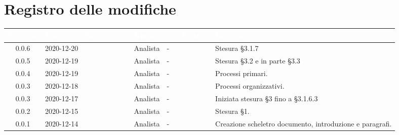 \section*{Registro delle modifiche}
{
\renewcommand{\arraystretch}{1.5}
\centering
\begin{longtable}{c C{2.6cm} C{2.6cm} C{2.6cm} C{2.6cm} C{3.5cm}}
\textcolor{white}{\textbf{Versione}}&
\textcolor{white}{\textbf{Data}}&
\textcolor{white}{\textbf{Nominativo}}&
\textcolor{white}{\textbf{Ruolo}}&
\textcolor{white}{\textbf{Verificatore}}&
\textcolor{white}{\textbf{Descrizione}}\\	
\endhead

0.0.6 & 2020-12-20 & \PA{} & Analista & - & Stesura \S 3.1.7 \\
0.0.5 & 2020-12-19 & \RA{} & Analista & - & Stesura \S 3.2 e in parte \S 3.3 \\
0.0.4 & 2020-12-19 & \ZM{} & Analista & - & Processi primari. \\
0.0.3 & 2020-12-18 & \SH{} & Analista & - & Processi organizzativi. \\
0.0.3 & 2020-12-17 & \PA{} & Analista & - & Iniziata stesura \S 3 fino a \S 3.1.6.3 \\
0.0.2 & 2020-12-15 & \PA{} & Analista & - & Stesura \S 1. \\
0.0.1 & 2020-12-14 & \ZM{} & Analista & - & Creazione scheletro documento, introduzione e paragrafi. \\
		
\end{longtable}
}
